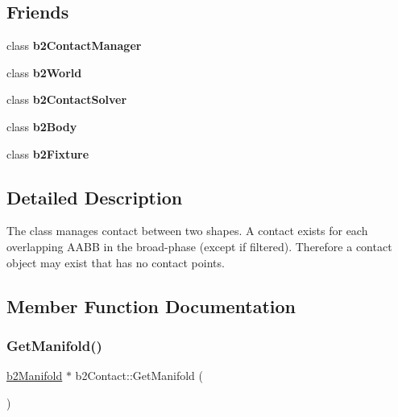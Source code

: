 \subsection*{Friends}
\begin{DoxyCompactItemize}
\item 
\mbox{\label{classb2Contact_aece264d42f69aed410f5eb3beba6ddf2}} 
class {\bfseries b2\+Contact\+Manager}
\item 
\mbox{\label{classb2Contact_a4bd536c5a7c0587913765bbc2693ceea}} 
class {\bfseries b2\+World}
\item 
\mbox{\label{classb2Contact_afb788a7ba90344f3ddbafff3de0465c4}} 
class {\bfseries b2\+Contact\+Solver}
\item 
\mbox{\label{classb2Contact_a010ab52de250e5fe30a45d642f46405b}} 
class {\bfseries b2\+Body}
\item 
\mbox{\label{classb2Contact_afb35b0e61f6ee3cc516c40ea251f3236}} 
class {\bfseries b2\+Fixture}
\end{DoxyCompactItemize}


\subsection{Detailed Description}
The class manages contact between two shapes. A contact exists for each overlapping A\+A\+BB in the broad-\/phase (except if filtered). Therefore a contact object may exist that has no contact points. 

\subsection{Member Function Documentation}
\mbox{\label{classb2Contact_ab0597077b23615476327f9b32d9c4979}} 
\subsubsection{\texorpdfstring{Get\+Manifold()}{GetManifold()}}
{\footnotesize\ttfamily \mbox{\hyperlink{structb2Manifold}{b2\+Manifold}} $\ast$ b2\+Contact\+::\+Get\+Manifold (\begin{DoxyParamCaption}{ }\end{DoxyParamCaption})\hspace{0.3cm}{\ttfamily [inline]}}

